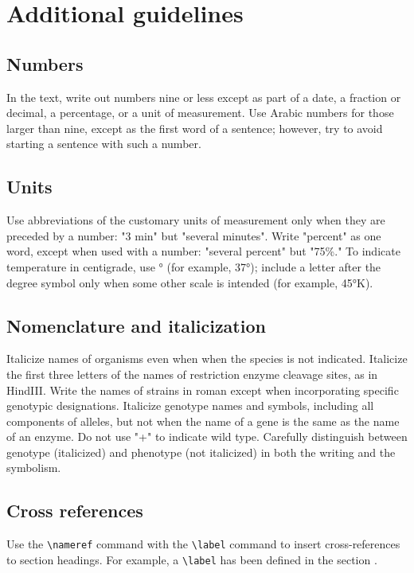\documentclass[9pt, onecolumn,twoside]{gsajnl}
\begin{document}
\section{Additional guidelines}

\subsection{Numbers} In the text, write out numbers nine or less except as part of a date, a fraction or decimal, a percentage, or a unit of measurement. Use Arabic numbers for those larger than nine, except as the first word of a sentence; however, try to avoid starting a sentence with such a number.

\subsection{Units} Use abbreviations of the customary units of measurement only when they are preceded by a number: "3 min" but "several minutes". Write "percent" as one word, except when used with a number: "several percent" but "75\%." To indicate temperature in centigrade, use ° (for example, 37°); include a letter after the degree symbol only when some other scale is intended (for example, 45°K).

\subsection{Nomenclature and italicization} Italicize names of organisms even when  when the species is not indicated.  Italicize the first three letters of the names of restriction enzyme cleavage sites, as in HindIII. Write the names of strains in roman except when incorporating specific genotypic designations. Italicize genotype names and symbols, including all components of alleles, but not when the name of a gene is the same as the name of an enzyme. Do not use "+" to indicate wild type. Carefully distinguish between genotype (italicized) and phenotype (not italicized) in both the writing and the symbolism.

\subsection{Cross references}
Use the \verb|\nameref| command with the \verb|\label| command to insert cross-references to section headings. For example, a \verb|\label| has been defined in the section .
\end{document}
